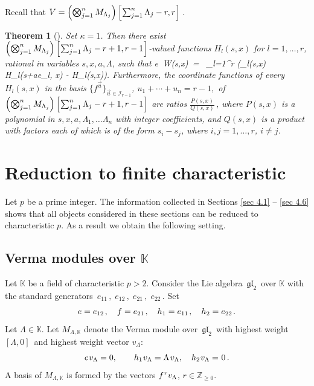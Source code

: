 \documentclass[12pt]{amsart}
\def\>{\relax\ifmmode\mskip.666667\thinmuskip\relax\else\kern.111111em\fi}
\def\<{\relax\ifmmode\mskip-.333333\thinmuskip\relax\else\kern-.0555556em\fi}
\newtheorem{thm}{Theorem}[section]
\theoremstyle{definition} %
\numberwithin{equation}{section}
\theoremstyle{definition}
\let\ka\kappa
\let\La\Lambda
\let\geq\geqslant
\def\Z{{\mathbb Z}}
\def\gl{\mathfrak{gl}}
\def\be{\begin{equation*}}
\def\ee{\end{equation*}}
\def\K{{\mathbb K}}
\begin{document}
Recall that $V=\left(\bigotimes^n_{j=1} M_{{\La_j}}\right)\left[\<\>\sum_{j=1}^n\La_j-r,r\<\>\right]\,.$


\begin{thm}
[\cite{TV1, TV2}]
\label{thm sing}
Set $\ka=1$.
Then there exist  
\\
$\left(\bigotimes^n_{j=1} M_{{\La_j}}\right)\left[\<\>\sum_{j=1}^n\La_j-r+1,r-1\<\>\right]$-valued 
functions $H_l(s,x)$ for $l=1,\dots,r$,   rational  in variables $s,x,a,\La$, such that
\bean
\label{Si}
e\, W(s,x) \,= \,
\sum_{l=1}^r \left(\Phi_l(s,x)\,H_{l}(s+ae_l, x) - H_{l}(s,x)\right).
\eean
 Furthermore, the coordinate functions of every $H_{l}(s,x)$
   in the basis 
   $\{f^{\vec u}\}_{\vec u\in\mathcal I_{r-1}}$,
$u_1+\cdots+u_n=r-1,$
    of 
   $\left(\bigotimes^n_{j=1} M_{{\La_j}}\right)\left[\<\>\sum_{j=1}^n\La_j-r+1,r-1\<\>\right]$
are ratios 
$\frac{P(s,x)}{Q(s,x)}$\,,
where  $P(s,x)$ is a polynomial in $s,x, a,{\La_1},\dots{\La_n}$
with integer coefficients, 
 and $Q(s,x)$ is a product with factors each of which is  of the form 
$s_i-s_j$, where $i,j=1,\dots, r$, $i\ne j$.
 
 \end{thm}




















\section{Reduction to finite characteristic}
\label{sec 5}

Let $p$ be a prime integer.
The information collected in Sections \ref{sec 4.1} -- \ref{sec 4.6} shows that all objects considered in
these sections can be reduced to characteristic $p$. As a result we obtain the following setting.

\subsection{Verma modules over $\K$}

Let $\K$ be a field of characteristic $p>2$.
Consider the Lie algebra \,$\gl_2$ \,over $\K$ with the standard generators
\,$e_{11}\,,\;e_{12}\,,\;e_{21}\,,\;e_{22}$\,. Set
\be
e=e_{12}\>,\quad f=e_{21}\>,\quad h_1=e_{11}\>,\quad h_2=e_{22}\>.
\ee
Let $\La\in\K$. Let $M_{\La,\K}$ denote the Verma module over \,$\gl_2$
\,with highest weight \,$[\La,0]$ \,and highest weight vector $v_\La$:
\be
e\<\>v_\La=0,\qquad h_1\<\>v_\La=\La\>v_\La,\quad h_2\<\>v_\La=\<\>0\,.
\ee
A basis of $M_{\La,\K}$ is formed by the vectors $f^{\<\>r}v_\La$, $r\in\Z_{\geq 0}$.
\end{document}
